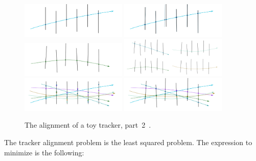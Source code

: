 \begin{figure}[htb]
    \begin{center}
        \includegraphics[width=0.45\textwidth]{../figs/Alignment/toyTracker07.png}
        \includegraphics[width=0.45\textwidth]{../figs/Alignment/toyTracker08.png}
        \includegraphics[width=0.45\textwidth]{../figs/Alignment/toyTracker09.png}
        \includegraphics[width=0.45\textwidth]{../figs/Alignment/toyTracker10.png}
        \includegraphics[width=0.45\textwidth]{../figs/Alignment/toyTracker12.png}
        \includegraphics[width=0.45\textwidth]{../figs/Alignment/toyTracker13.png}
    \end{center}
    \caption{The alignment of a toy tracker, part~2~\cite{ref_Frank_presentation}.}
    \label{fig:toyTracker_part2}
\end{figure}


The tracker alignment problem is the least squared problem. The expression to minimize is the following:

